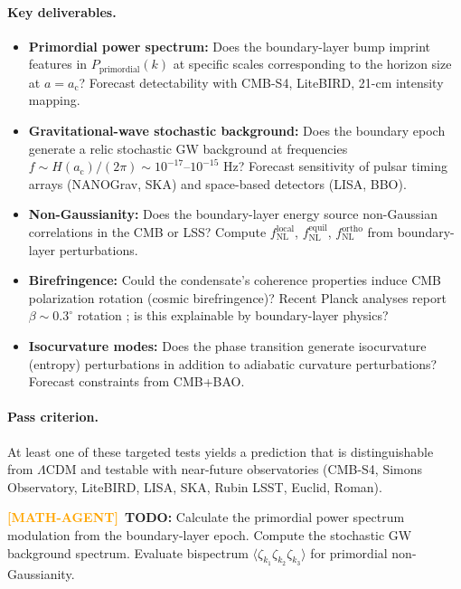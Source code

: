 \documentclass[11pt,a4paper]{article}
\newcommand{\ac}{a_{\mathrm{c}}}
\theoremstyle{definition}
\newcommand{\MATHAGENT}{\textcolor{orange}{\textbf{[MATH-AGENT]}}}
\begin{document}
\paragraph{Key deliverables.}
\begin{itemize}[leftmargin=1.8em]
  \item \textbf{Primordial power spectrum:} Does the boundary-layer bump imprint features in $P_{\mathrm{primordial}}(k)$ at specific scales corresponding to the horizon size at $a = \ac$? Forecast detectability with CMB-S4, LiteBIRD, 21-cm intensity mapping.
  \item \textbf{Gravitational-wave stochastic background:} Does the boundary epoch generate a relic stochastic GW background at frequencies $f \sim H(\ac) / (2\pi) \sim 10^{-17}$--$10^{-15}$ Hz? Forecast sensitivity of pulsar timing arrays (NANOGrav, SKA) and space-based detectors (LISA, BBO).
  \item \textbf{Non-Gaussianity:} Does the boundary-layer energy source non-Gaussian correlations in the CMB or LSS? Compute $f_{\mathrm{NL}}^{\mathrm{local}}$, $f_{\mathrm{NL}}^{\mathrm{equil}}$, $f_{\mathrm{NL}}^{\mathrm{ortho}}$ from boundary-layer perturbations.
  \item \textbf{Birefringence:} Could the condensate's coherence properties induce CMB polarization rotation (cosmic birefringence)? Recent Planck analyses report $\beta \sim 0.3^\circ$ rotation \cite{PlanckBirefringence2020}; is this explainable by boundary-layer physics?
  \item \textbf{Isocurvature modes:} Does the phase transition generate isocurvature (entropy) perturbations in addition to adiabatic curvature perturbations? Forecast constraints from CMB+BAO.
\end{itemize}

\paragraph{Pass criterion.}
At least one of these targeted tests yields a prediction that is distinguishable from $\Lambda$CDM and testable with near-future observatories (CMB-S4, Simons Observatory, LiteBIRD, LISA, SKA, Rubin LSST, Euclid, Roman).

\MATHAGENT~\textbf{TODO:} Calculate the primordial power spectrum modulation from the boundary-layer epoch. Compute the stochastic GW background spectrum. Evaluate bispectrum $\langle \zeta_{k_1} \zeta_{k_2} \zeta_{k_3} \rangle$ for primordial non-Gaussianity.
\end{document}
